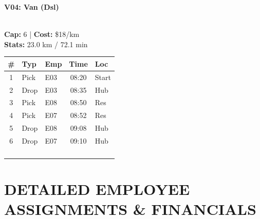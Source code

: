 \documentclass[a4paper,11pt]{article}
\begin{document}
\hfill
\begin{minipage}[t]{0.24\textwidth}
    \centering
    \colorbox{velorablue}{\parbox{\dimexpr\linewidth-2\fboxsep}{\centering \color{white}\textbf{V04: Van (Dsl)}}} \\
    \vspace{0.05cm}
    {\tiny \textbf{Cap:} 6 | \textbf{Cost:} \$18/km \\ \textbf{Stats:} 23.0 km / 72.1 min}
    \vspace{0.05cm}
    
    \renewcommand{\arraystretch}{0.9}
    \setlength{\tabcolsep}{1pt}
    \tiny
    \begin{tabular}{c l l c l}
        \toprule
        \textbf{\#} & \textbf{Typ} & \textbf{Emp} & \textbf{Time} & \textbf{Loc} \\
        \midrule
        1 & Pick & E03 & 08:20 & Start \\
        \rowcolor{headergray} 2 & Drop & E03 & 08:35 & Hub \\
        3 & Pick & E08 & 08:50 & Res \\
        \rowcolor{headergray} 4 & Pick & E07 & 08:52 & Res \\
        5 & Drop & E08 & 09:08 & Hub \\
        \rowcolor{headergray} 6 & Drop & E07 & 09:10 & Hub \\
        & & & & \\
        & & & & \\
        & & & & \\
        & & & & \\
        \bottomrule
    \end{tabular}
\end{minipage}

\vspace{0.2cm}

\section*{\uppercase{\color{velorablue} Detailed Employee Assignments \& Financials}}
\vspace{-0.3cm}
\end{document}
